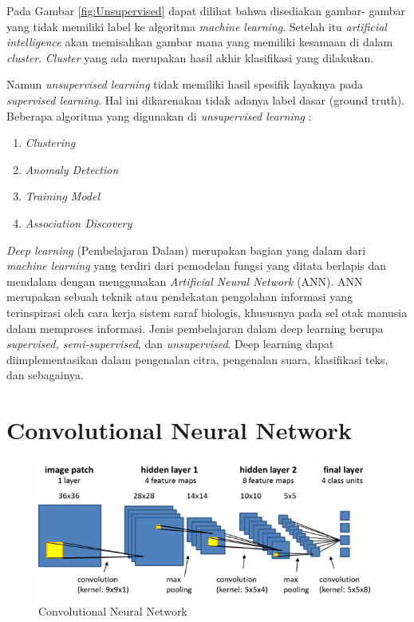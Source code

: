 \pagebreak

\par Pada Gambar \ref{fig:Unsupervised} dapat dilihat bahwa disediakan gambar- gambar yang tidak memiliki label ke algoritma \textit{machine learning}. Setelah itu \textit{artificial intelligence} akan memisahkan gambar mana yang memiliki kesamaan di dalam \textit{cluster}. \textit{Cluster} yang ada merupakan hasil akhir klasifikasi yang dilakukan.

\par Namun \textit{unsupervised learning} tidak memiliki hasil spesifik layaknya pada \textit{supervised learning}. Hal ini dikarenakan tidak adanya label dasar (ground truth). Beberapa algoritma yang digunakan di \textit{unsupervised learning} :
\begin{enumerate}
	\vspace{-2mm}
	\item \textit{Clustering}
	\vspace{-2mm}
	\item \textit{Anomaly Detection}
	\vspace{-2mm}
	\item \textit{Training Model}
	\vspace{-2mm}
	\item \textit{Association Discovery}
\end{enumerate}

\vspace{1ex}

\par \textit{Deep learning} (Pembelajaran Dalam) merupakan bagian yang dalam dari \textit{machine learning} yang terdiri dari pemodelan fungsi yang ditata berlapis dan mendalam dengan menggunakan \textit{Artificial Neural Network} (ANN). ANN merupakan sebuah teknik atau pendekatan pengolahan informasi yang terinspirasi oleh cara kerja sistem saraf biologis, khususnya pada sel otak manusia dalam memproses informasi. Jenis pembelajaran dalam deep learning berupa \textit{supervised, semi-supervised}, dan \textit{unsupervised}. Deep learning dapat diimplementasikan dalam pengenalan citra, pengenalan suara, klasifikasi teks, dan sebagainya.

\section{Convolutional Neural Network}
\vspace{1ex}

\begin{figure}[h!]
	\centering
	\includegraphics[scale=0.55]{img/CNN_scheme.png}
	\caption{Convolutional Neural Network}
	\label{fig:Convolutional Neural Network}
\end{figure}



